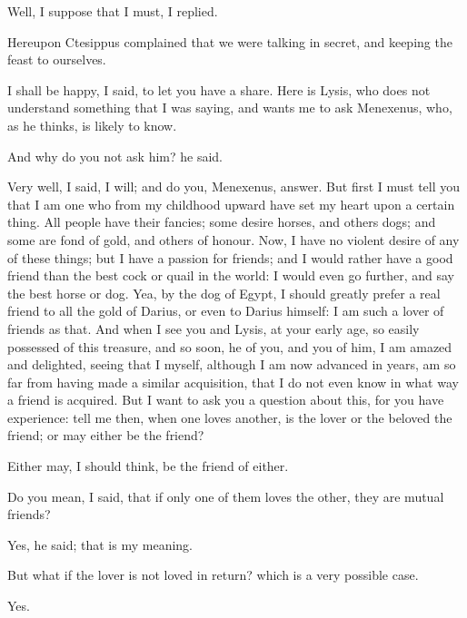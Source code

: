 \documentclass[11pt,letter]{article}
\begin{document}
\par  Well, I suppose that I must, I replied.

\par  Hereupon Ctesippus complained that we were talking in secret, and keeping the feast to ourselves.

\par  I shall be happy, I said, to let you have a share. Here is Lysis, who does not understand something that I was saying, and wants me to ask Menexenus, who, as he thinks, is likely to know.

\par  And why do you not ask him? he said.

\par  Very well, I said, I will; and do you, Menexenus, answer. But first I must tell you that I am one who from my childhood upward have set my heart upon a certain thing. All people have their fancies; some desire horses, and others dogs; and some are fond of gold, and others of honour. Now, I have no violent desire of any of these things; but I have a passion for friends; and I would rather have a good friend than the best cock or quail in the world: I would even go further, and say the best horse or dog. Yea, by the dog of Egypt, I should greatly prefer a real friend to all the gold of Darius, or even to Darius himself: I am such a lover of friends as that. And when I see you and Lysis, at your early age, so easily possessed of this treasure, and so soon, he of you, and you of him, I am amazed and delighted, seeing that I myself, although I am now advanced in years, am so far from having made a similar acquisition, that I do not even know in what way a friend is acquired. But I want to ask you a question about this, for you have experience: tell me then, when one loves another, is the lover or the beloved the friend; or may either be the friend?

\par  Either may, I should think, be the friend of either.

\par  Do you mean, I said, that if only one of them loves the other, they are mutual friends?

\par  Yes, he said; that is my meaning.

\par  But what if the lover is not loved in return? which is a very possible case.

\par  Yes.
\end{document}
